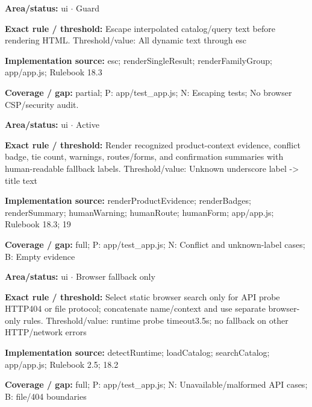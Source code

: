 \begin{tcolorbox}[enhanced,breakable,colback=white,colframe=Muted!45,boxrule=0.45pt,arc=1.5pt,left=6pt,right=6pt,top=5pt,bottom=5pt,title={\texttt{UI-ESCAPE-09}},title after break={\texttt{UI-ESCAPE-09}\ (continued)},fonttitle=\headingfont\bfseries\color{Navy},coltitle=Navy]
\textbf{Area/status:} ui $\boldsymbol{\cdot}$ Guard\par
\smallskip
\textbf{Exact rule / threshold:} Escape interpolated catalog/\allowbreak{}query text before rendering HTML. Threshold/\allowbreak{}value: All dynamic text through esc\par
\smallskip
\textbf{Implementation source:} esc; renderSingleResult; renderFamilyGroup; app/\allowbreak{}app.js; Rulebook 18.3\par
\smallskip
\textbf{Coverage / gap:} partial; P: app/\allowbreak{}test\_\allowbreak{}app.js; N: Escaping tests; No browser CSP/\allowbreak{}security audit.
\end{tcolorbox}
\begin{tcolorbox}[enhanced,breakable,colback=white,colframe=Muted!45,boxrule=0.45pt,arc=1.5pt,left=6pt,right=6pt,top=5pt,bottom=5pt,title={\texttt{UI-EVIDENCE-08}},title after break={\texttt{UI-EVIDENCE-08}\ (continued)},fonttitle=\headingfont\bfseries\color{Navy},coltitle=Navy]
\textbf{Area/status:} ui $\boldsymbol{\cdot}$ Active\par
\smallskip
\textbf{Exact rule / threshold:} Render recognized product-context evidence, conflict badge, tie count, warnings, routes/\allowbreak{}forms, and confirmation summaries with human-readable fallback labels. Threshold/\allowbreak{}value: Unknown underscore label -> title text\par
\smallskip
\textbf{Implementation source:} renderProductEvidence; renderBadges; renderSummary; humanWarning; humanRoute; humanForm; app/\allowbreak{}app.js; Rulebook 18.3; 19\par
\smallskip
\textbf{Coverage / gap:} full; P: app/\allowbreak{}test\_\allowbreak{}app.js; N: Conflict and unknown-label cases; B: Empty evidence
\end{tcolorbox}
\begin{tcolorbox}[enhanced,breakable,colback=white,colframe=Muted!45,boxrule=0.45pt,arc=1.5pt,left=6pt,right=6pt,top=5pt,bottom=5pt,title={\texttt{UI-FALLBACK-06}},title after break={\texttt{UI-FALLBACK-06}\ (continued)},fonttitle=\headingfont\bfseries\color{Navy},coltitle=Navy]
\textbf{Area/status:} ui $\boldsymbol{\cdot}$ Browser fallback only\par
\smallskip
\textbf{Exact rule / threshold:} Select static browser search only for API probe HTTP404 or file protocol; concatenate name/\allowbreak{}context and use separate browser-only rules. Threshold/\allowbreak{}value: runtime probe timeout3.5s; no fallback on other HTTP/\allowbreak{}network errors\par
\smallskip
\textbf{Implementation source:} detectRuntime; loadCatalog; searchCatalog; app/\allowbreak{}app.js; Rulebook 2.5; 18.2\par
\smallskip
\textbf{Coverage / gap:} full; P: app/\allowbreak{}test\_\allowbreak{}app.js; N: Unavailable/\allowbreak{}malformed API cases; B: file/\allowbreak{}404 boundaries
\end{tcolorbox}
